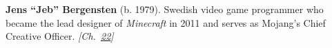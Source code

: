 \textbf{Jens ``Jeb'' Bergensten} (b. 1979). Swedish video game programmer who became the lead designer of \emph{Minecraft} in 2011 and serves as Mojang's Chief Creative Officer. \emph{[Ch.~\hyperref[ch:minecraftcreeper]{22}]}

